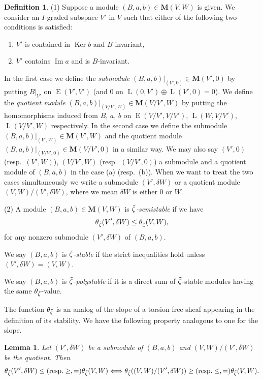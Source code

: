 \documentclass[pdftex]{sigma}
\newenvironment{aenume}{%
  \begin{enumerate}%
  \renewcommand{\theenumi}{\alph{enumi}}%
  \renewcommand{\labelenumi}{\textup{(\theenumi)}}%
  }{\end{enumerate}}
\newtheorem{Lemma}[equation]{Lemma}
\theoremstyle{definition}
\newtheorem{Definition}[equation]{Definition}
\numberwithin{equation}{section}
\newcommand{\Ker}{\operatorname{Ker}}
\newcommand{\Ima}{\operatorname{Im}}
\newcommand{\bM}{{\mathbf M}} %
\newcommand{\HomE}{\operatorname{E}}
\newcommand{\HomL}{\operatorname{L}}
\begin{document}
\begin{Definition}\label{def:stable}
  \textup{(1)} Suppose a module $(B, a, b)\in\bM(V,W)$ is given. We
  consider an $I$-graded subspace $V'$ in $V$ such that either of the
  following two conditions is satisf\/ied:
\begin{aenume}\itemsep=0pt
\item $V'$ is contained in $\Ker b$ and $B$-invariant,
\item $V'$ contains $\Ima a$ and is $B$-invariant.
\end{aenume}
In the f\/irst case we def\/ine the {\it submodule\/} $(B,a,b)|_{(V',0)} \in
\bM(V',0)$ by putting $B|_{V'}$ on $\HomE(V',V')$ (and $0$ on
$\HomL(0,V')\oplus \HomL(V',0) = 0$). We def\/ine the {\it quotient
  module\/} $(B,a,b)|_{(V/V',W)}\!\in\! \bM(V/V',W)\!$ by putting
the homomorphisms induced from $B$, $a$, $b$ on
$\HomE(V/V',V/V')$, $\HomL(W,V/V')$, $\HomL(V/V',W)$ respectively.
%
In the second case we def\/ine the submodule
$(B,a,b)|_{(V',W)}\in \bM(V',W)$ and the quotient module
$(B,a,b)|_{(V/V',0)}\in \bM(V/V',0)$ in a similar way.
%
We may also say $(V',0)$ \textup(resp.\ $(V',W)$\textup), $(V/V',W)$
\textup(resp.\ $(V/V',0)$\textup) a submodule and a quotient module
of $(B,a,b)$ in the case (a) \textup(resp.\ (b)\textup).
%
When we want to treat the two cases simultaneously we write
a submodule $(V',\delta W)$ or a quotient module $(V, W)/(V',\delta W)$,
where we mean $\delta W$ is either $0$ or $W$.

\textup{(2)} A module $(B, a, b)\in\bM(V,W)$ is {\it
$\Tilde\zeta$-semistable\/} if we have
\begin{equation}\label{eq:slope}
   \theta_{\Tilde\zeta}(V',\delta W) \le \theta_{\Tilde\zeta}(V,W),
\end{equation}
for any nonzero submodule $(V',\delta W)$ of $(B,a,b)$.

We say $(B,a,b)$ is {\it $\Tilde\zeta$-stable\/} if the strict
inequalities hold unless $(V',\delta W) = (V,W)$.


We say $(B,a,b)$ is {\it $\Tilde\zeta$-polystable\/} if it is a
direct sum of $\Tilde\zeta$-stable modules having the same
$\theta_{\Tilde\zeta}$-value.
\end{Definition}

The function $\theta_{\Tilde\zeta}$ is an analog of the slope of a
torsion free sheaf appearing in the def\/inition of its stability. We
have the following property analogous to one for the slope.
\begin{Lemma}\label{lem:slope}
  Let $(V',\delta W)$ be a submodule of $(B,a,b)$ and
  $(V,W)/(V',\delta W)$ be the quotient. Then
  \begin{equation*}
     \theta_{\Tilde\zeta}(V',\delta W)
     \le (\text{resp.} \ge, =)
     \theta_{\Tilde\zeta}(V,W)
     \Longleftrightarrow
     \theta_{\Tilde\zeta}((V,W)/(V',\delta W))
     \ge (\text{resp.} \le, =)
     \theta_{\Tilde\zeta}(V,W).
  \end{equation*}
\end{Lemma}
\end{document}
